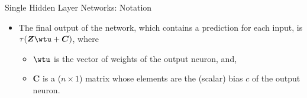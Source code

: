 \begin{vbframe}{Single Hidden Layer Networks: Notation}
\framebreak
  \begin{itemize}
    \vspace{15mm}
    \item The final output of the network, which contains a prediction for each input, is $\tau(\bm{Z}\wtu + \bm{C})$, where
      \begin{itemize}
        \vspace{2mm}
        \item $\wtu$ is the vector of weights of the output neuron, and,
        \vspace{2mm}
        \item $\bm{C}$ is a ($n \times 1$) matrix whose elements are the (scalar) bias $c$ of the output neuron.
      \end{itemize}
  \end{itemize}
\end{vbframe}

